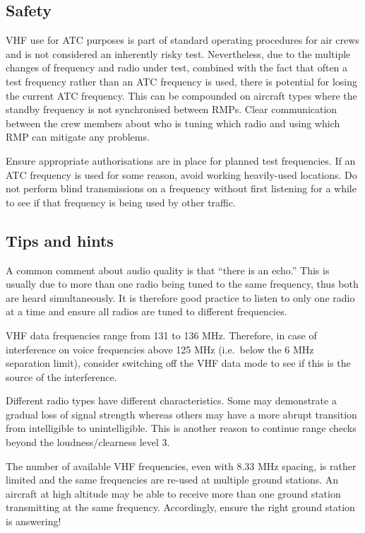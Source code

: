 \documentclass[
]{book}
\begin{document}
\hypertarget{safety}{%
\subsection{Safety}\label{safety}}

VHF use for ATC purposes is part of standard operating procedures for air crews
and is not considered an inherently risky test. Nevertheless, due to the
multiple changes of frequency and radio under test, combined with the fact that
often a test frequency rather than an ATC frequency is used, there is potential
for losing the current ATC frequency. This can be compounded on aircraft types
where the standby frequency is not synchronised between RMPs. Clear
communication between the crew members about who is tuning which radio and
using which RMP can mitigate any problems.

Ensure appropriate authorisations are in place for planned test frequencies. If
an ATC frequency is used for some reason, avoid working heavily-used locations.
Do not perform blind transmissions on a frequency without first listening for a
while to see if that frequency is being used by other traffic.

\hypertarget{tips-and-hints}{%
\subsection{Tips and hints}\label{tips-and-hints}}

A common comment about audio quality is that ``there is an echo.'' This is
usually due to more than one radio being tuned to the same frequency, thus both
are heard simultaneously. It is therefore good practice to listen to only one
radio at a time and ensure all radios are tuned to different frequencies.

VHF data frequencies range from 131 to 136 MHz. Therefore, in case of
interference on voice frequencies above 125 MHz (i.e.~below the 6 MHz
separation limit), consider switching off the VHF data mode to see if this is
the source of the interference.

Different radio types have different characteristics. Some may demonstrate a
gradual loss of signal strength whereas others may have a more abrupt
transition from intelligible to unintelligible. This is another reason to
continue range checks beyond the loudness/clearness level 3.

The number of available VHF frequencies, even with 8.33 MHz spacing, is rather
limited and the same frequencies are re-used at multiple ground stations. An
aircraft at high altitude may be able to receive more than one ground station
transmitting at the same frequency. Accordingly, ensure the right ground
station is answering!
\end{document}
